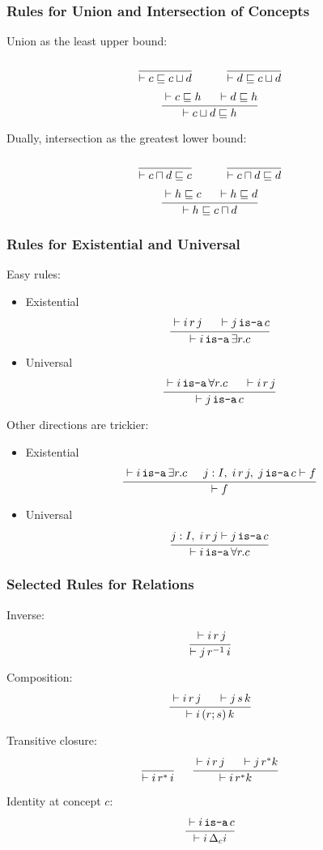 \begin{frame}\frametitle{Rules for Union and Intersection of Concepts}
Union as the least upper bound:
\[\rul{}{\vdash c\sqsubseteq c\sqcup d} \tb\tb \rul{}{\vdash d\sqsubseteq c\sqcup d }\]
\[\cfrac{\vdash c\sqsubseteq h \hspace*{.5cm} \vdash d\sqsubseteq h}{\vdash c\sqcup d \sqsubseteq h}\,\]
\medskip

Dually, intersection as the greatest lower bound:
\[\rul{}{\vdash c\sqcap d\sqsubseteq c} \tb\tb \rul{}{\vdash c\sqcap d\sqsubseteq d}\]
\[\cfrac{\vdash h\sqsubseteq c \hspace*{.5cm} \vdash h\sqsubseteq d}{\vdash h \sqsubseteq c\sqcap d}\,\]
\end{frame}

\begin{frame}\frametitle{Rules for Existential and Universal}
Easy rules:
\begin{itemize}
\item Existential
\[\cfrac{\vdash i\,r\,j \hspace*{.5cm} \vdash j\mathop{\texttt{is-a}} c}{\vdash i \mathop{\texttt{is-a}} \exists r.c }\,\]
\item Universal
\[\cfrac{\vdash i \mathop{\texttt{is-a}} \forall r.c \hspace*{.5cm} \vdash i\,r\,j}{\vdash j\mathop{\texttt{is-a}} c}\,\]
\end{itemize}

Other directions are trickier:

\begin{itemize}
\item Existential
\[\cfrac{\vdash i \mathop{\texttt{is-a}} \exists r.c \hspace*{.5cm} j:I,\;i\,r\,j,\;j\mathop{\texttt{is-a}} c\vdash f}{\vdash f}\,\]
\item Universal
\[\cfrac{j:I,\; i\,r\,j\vdash j\mathop{\texttt{is-a}} c}{\vdash i\mathop{\texttt{is-a}}\forall r.c}\,\]
\end{itemize}
\end{frame}

\begin{frame}\frametitle{Selected Rules for Relations}
Inverse:
\[\cfrac{\vdash i \,r\,j}{\vdash j\,r^{-1}\,i}\,\]

Composition:
\[\cfrac{\vdash i \,r\,j \hspace*{.5cm} \vdash j\,s\,k}{\vdash i\,(r;s)\,k}\,\]

Transitive closure:
\[\cfrac{}{\vdash i \,r^*\,i}\, \hspace*{.5cm} \cfrac{\vdash i\,r\,j \hspace*{.5cm} \vdash j\,r^* k}{\vdash i\,r^* k}\,\]

Identity at concept $c$:
\[\cfrac{\vdash i \mathop{\texttt{is-a}} c}{\vdash i\,\Delta_c i}\,\]
\end{frame}

